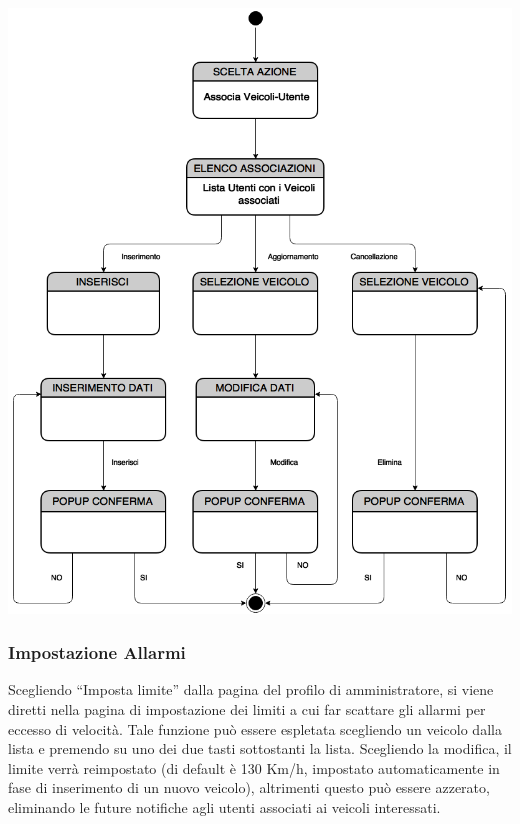 \documentclass[a4paper,12pt]{beamer}
\begin{document}
\begin{frame}
\begin{center}
\includegraphics[scale=0.45]{../UseCase/Associa.png}
\end{center}
\end{frame}



\begin{frame}
\frametitle{Impostazione Allarmi}
Scegliendo ``Imposta limite'' dalla pagina del profilo di amministratore, si viene diretti nella pagina di impostazione dei limiti a cui far scattare gli allarmi per eccesso di velocità. Tale funzione può essere espletata scegliendo un veicolo dalla lista e premendo su uno dei due tasti sottostanti la lista. Scegliendo la modifica, il limite verrà reimpostato (di default è 130 Km/h, impostato automaticamente in fase di inserimento di un nuovo veicolo), altrimenti questo può essere azzerato, eliminando le future notifiche agli utenti associati ai veicoli interessati.
\end{frame}
\end{document}
